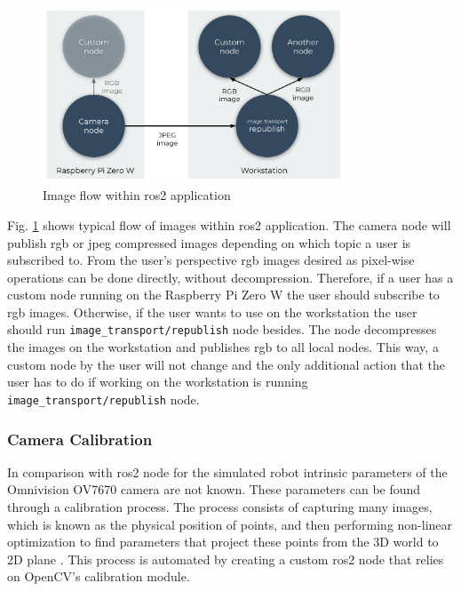\begin{figure}[H]
    \centering
    \includegraphics[width=0.8\textwidth]{physical/figures/camera_ros_images.pdf}
    \caption{Image flow within \ac{ros2} application}
    \label{fig:physical:camera_ros_images}
\end{figure}

Fig. \ref{fig:physical:camera_ros_images} shows typical flow of images within \ac{ros2} application.
The camera node will publish \acs{rgb} or \acs{jpeg} compressed images depending on which topic a user is subscribed to.
From the user's perspective \ac{rgb} images desired as pixel-wise operations can be done directly, without decompression.
Therefore, if a user has a custom node running on the Raspberry Pi Zero W the user should subscribe to \ac{rgb} images.
Otherwise, if the user wants to use on the workstation the user should run \texttt{image\_transport/republish} node besides.
The node decompresses the images on the workstation and publishes \ac{rgb} to all local nodes.
This way, a custom node by the user will not change and the only additional action that the user has to do if working on the workstation is running \texttt{image\_transport/republish} node.
 
\subsubsection{Camera Calibration}
In comparison with \ac{ros2} node for the simulated robot intrinsic parameters of the Omnivision OV7670 camera are not known.
These parameters can be found through a calibration process. The process consists of capturing many images, which is known as the physical position of points, and then performing non-linear optimization to find parameters that project these points from the 3D world to 2D plane \cite{lukic_dual_nodate}. This process is automated by creating a custom \ac{ros2} node that relies on OpenCV's calibration module.

